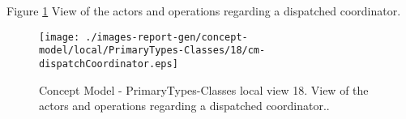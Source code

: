 Figure \ref{fig:lu.uni.lassy.excalibur.group09.spec-CM-view-local-PrimaryTypes-Classes-18} View of the actors and operations regarding a dispatched coordinator.



\begin{figure}[htbp] 
\label{fig:lu.uni.lassy.excalibur.group09.spec-CM}
\begin{center}
\texttt{[image: ./images-report-gen/concept-model/local/PrimaryTypes-Classes/18/cm-dispatchCoordinator.eps]}
\end{center}
\caption[Concept Model - PrimaryTypes-Classes local view 18 - View of the actors and operations re]{Concept Model - PrimaryTypes-Classes local view 18. View of the actors and operations regarding a dispatched coordinator..}
\label{fig:lu.uni.lassy.excalibur.group09.spec-CM-view-local-PrimaryTypes-Classes-18}
\end{figure}
\vspace{0.5cm} 
